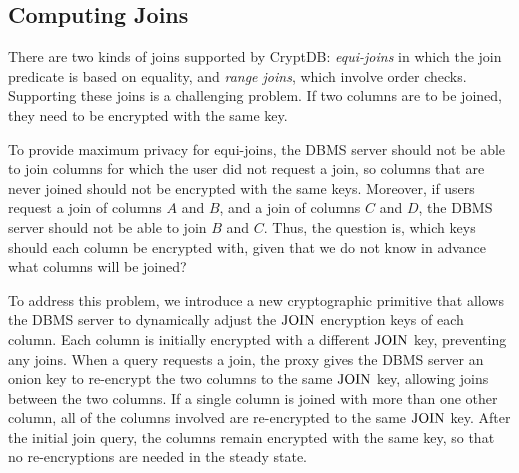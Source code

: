 
\subsection{Computing Joins}
\label{ss:join}

There are two kinds of joins supported by CryptDB: {\em equi-joins} in
which the join predicate is based on equality, and {\em range joins},
which involve order checks.  Supporting these joins is a challenging
problem.  If two columns are to be joined, they need to be encrypted
with the same key.



To provide maximum privacy for equi-joins, the DBMS server should not
be able to join columns for which the user did not request a join, so
columns that are never joined should not be encrypted with the same
keys.  Moreover, if users request a join of columns $A$
and $B$, and a join of columns $C$ and $D$, the DBMS server should not
be able to join $B$ and $C$\@.  Thus, the question is, which keys
should each column be encrypted with, given that we do not know in
advance what columns will be joined?

To address this problem, we introduce a new cryptographic primitive that
allows the DBMS server to dynamically adjust the $\textrm{JOIN}$ encryption keys
of each column.  Each column is initially encrypted with a different
$\textrm{JOIN}$ key, preventing any joins.  When a query requests a join, the
proxy gives the DBMS server an onion key to re-encrypt the two columns
to the same $\textrm{JOIN}$ key, allowing joins between the two columns.  If a
single column is joined with more than one other column, all of the
columns involved are re-encrypted to the same $\textrm{JOIN}$ key.  After the
initial join query, the columns remain encrypted with the same key,
so that no re-encryptions are needed in the steady state.

